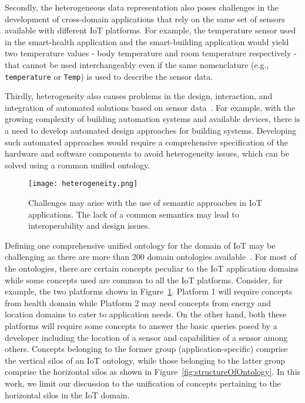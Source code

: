 \documentclass{elsart}  %
\begin{document}
Secondly, the heterogeneous data representation also poses challenges in the development of cross-domain applications that rely on the same set of sensors~\cite{gyrard2014enrich} available with different IoT platforms. For example, the temperature sensor used in the smart-health application and the smart-building application would yield two temperature values - body temperature and room temperature respectively - that cannot be used interchangeably even if the same nomenclature (e.g., \texttt{temperature} or \texttt{Temp}) is used to describe the sensor data.

Thirdly, heterogeneity also causes problems in the design, interaction, and integration of automated solutions based on sensor data~\cite{Dibowski:2011:ODD:1945420.1945423}. For example, with the growing complexity of building automation systems and available devices, there is a need to develop automated design approaches for building systems. Developing such automated approaches would require a comprehensive specification of the hardware and software components to avoid heterogeneity issues, which can be solved using a common unified ontology.

\begin{figure}
\texttt{[image: heterogeneity.png]}
\caption{Challenges may arise with the use of semantic approaches in IoT applications. The lack of a common semantics may lead to interoperability and design issues.}
\label{fig:heterogeneiry_issues}
\end{figure}
\par 

Defining one comprehensive unified ontology for the domain of IoT may be challenging as there are more than 200 domain ontologies available~\cite{amelieLov4IoT}. For most of the ontologies, there are certain concepts peculiar to the IoT application domains while some concepts used are common to all the IoT platforms. Consider, for example, the two platforms shown in Figure~\ref{fig:heterogeneiry_issues}. Platform 1 will require concepts from health domain while Platform 2 may need concepts from energy and location domains to cater to application needs. On the other hand, both these platforms will require some concepts to answer the basic queries posed by a developer including the location of a sensor and capabilities of a sensor among others. Concepts belonging to the former group (application-specific) comprise the vertical silos of an IoT ontology, while those belonging to the latter group comprise the horizontal silos as shown in Figure~\ref{fig:structureOfOntology}. In this work, we limit our discussion to the unification of concepts pertaining to the horizontal silos in the IoT domain.
\end{document}

